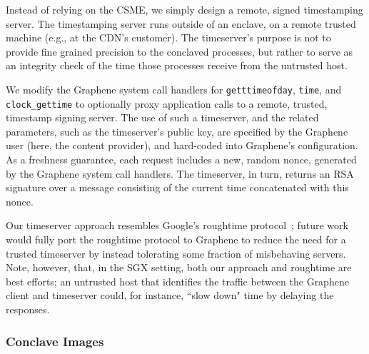 Instead of relying on the CSME, we simply design a remote, signed
timestamping server.
%
The timestamping server runs outside of an enclave, on a remote trusted
machine (e.g., at the CDN's customer).
%
The timeserver's purpose is not to provide fine grained precision to
the conclaved processes, but rather to serve as an integrity check of
the time those processes receive from the untrusted host.

We modify the Graphene system call handlers for \texttt{getttimeofday},
\texttt{time}, and \texttt{clock\_gettime} to optionally proxy application
calls to a remote, trusted, timestamp signing server.
%
The use of such a timeserver, and the related parameters, such as the
timeserver's public key, are specified by the Graphene user (here, the content
provider), and hard-coded into Graphene's configuration.
%
As a freshness guarantee, each request includes a new, random
nonce, generated by the Graphene system call handlers.
%
The timeserver, in turn, returns an RSA signature over a message
consisting of the current time concatenated with this nonce.




Our timeserver approach resembles Google's roughtime protocol~\cite{roughtime};
future work would fully port the roughtime protocol to Graphene to reduce the
need for a trusted timeserver by instead tolerating some fraction of
misbehaving servers.
%
Note, however, that, in the SGX setting, both our approach and roughtime are best
efforts; an untrusted host that identifies the traffic between the Graphene
client and timeserver could, for instance, ``slow down" time by delaying the
responses.



\subsubsection{Conclave Images} %


